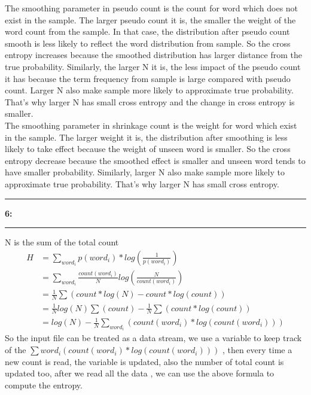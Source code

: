 \documentclass[11pt]{article}
\newcommand\question[2]{\vspace{.25in}\hrule\textbf{#1: #2}\vspace{.5em}\hrule\vspace{.10in}}
\begin{document}
\justify
The smoothing parameter in pseudo count is the count for word which does not exist in the sample. The larger pseudo count it is, the smaller the weight of the word count from the sample. In that case, the distribution after pseudo count smooth is less likely to reflect the word distribution from sample. So the cross entropy increases because the smoothed distribution has larger distance from the true probability. Similarly, the larger N it is, the less impact of the pseudo count it has because the term frequency from sample is large compared with pseudo count. Larger N also make sample more likely to approximate true probability. That's why larger N has small cross entropy and the change in cross entropy is smaller.\\
The smoothing parameter in shrinkage count is the weight for word which exist in the sample. The larger weight it is, the distribution after smoothing is less likely to take effect because the weight of unseen word is smaller. So the cross entropy decrease because the smoothed effect is smaller and unseen word tends to have smaller probability. Similarly, larger N also make sample more likely to approximate true probability. That's why larger N has small cross entropy.\\
\question{6}{}
N is the sum of the total count\\
\begin{align*}
	H &= \sum_{word_i} p(word_i)*log(\frac{1}{p(word_i)}) \\&= \sum_{word_i} \frac{count(word_i)}{N} log(\frac{N}{count(word_i)})\\
	&= \frac{1}{N} \sum(count*log(N)-count*log(count))\\
	&= \frac{1}{N}log(N)\sum(count) - \frac{1}{N}\sum(count*log(count))\\
	&= log(N) - \frac{1}{N}\sum_{word_i}(count(word_i)*log(count(word_i)))
\end{align*}
\justify
So the input file can be treated as a data stream, we use a variable to keep track of the $\sum{word_i}(count(word_i)*log(count(word_i)))$ , then every time a new count is read, the variable is updated, also the number of total count is updated too, after we read all the data , we can use the above formula to compute the entropy.
\end{document}
